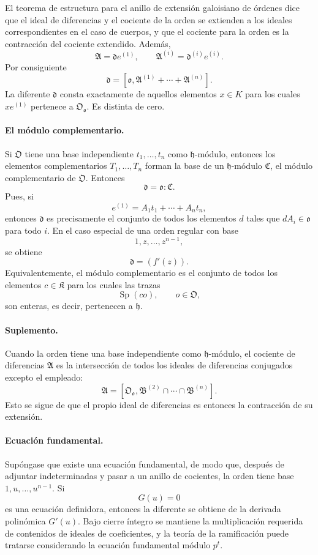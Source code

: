 \documentclass[11pt]{article}
\begin{document}
El teorema de estructura para el anillo de extensión galoisiano de órdenes dice que el ideal de diferencias y el cociente de la orden se extienden a los ideales correspondientes en el caso de cuerpos, y que el cociente para la orden es la contracción del cociente extendido. Además,
\[
        \mathfrak A=\mathfrak d e^{(1)},
        \qquad
        \mathfrak A^{(i)}=\mathfrak d^{(i)}e^{(i)}.
\]
Por consiguiente
\[
        \mathfrak d=[\mathfrak o,
        \mathfrak A^{(1)}+
        \cdots+\mathfrak A^{(n)}].
\]
La diferente $\mathfrak d$ consta exactamente de aquellos elementos $x\in K$ para los cuales $xe^{(1)}$ pertenece a $\mathfrak O_{\mathfrak o}$. Es distinta de cero.

\paragraph{El módulo complementario.}
Si $\mathfrak O$ tiene una base independiente $t_1,\ldots,t_n$ como $\mathfrak h$-módulo, entonces los elementos complementarios $T_1,\ldots,T_n$ forman la base de un $\mathfrak h$-módulo $\mathfrak C$, el módulo complementario de $\mathfrak O$. Entonces
\[
        \mathfrak d=\mathfrak o:\mathfrak C.
\]
Pues, si
\[
        e^{(1)}=A_1t_1+
        \cdots+A_nt_n,
\]
entonces $\mathfrak d$ es precisamente el conjunto de todos los elementos $d$ tales que $dA_i\in\mathfrak o$ para todo $i$. En el caso especial de una orden regular con base
\[
        1,z,\ldots,z^{n-1},
\]
se obtiene
\[
        \mathfrak d=(f'(z)).
\]
Equivalentemente, el módulo complementario es el conjunto de todos los elementos $c\in\mathfrak K$ para los cuales las trazas
\[
        \operatorname{Sp}(co),\qquad o\in\mathfrak O,
\]
son enteras, es decir, pertenecen a $\mathfrak h$.

\paragraph{Suplemento.}
Cuando la orden tiene una base independiente como $\mathfrak h$-módulo, el cociente de diferencias $\mathfrak A$ es la intersección de todos los ideales de diferencias conjugados excepto el empleado:
\[
        \mathfrak A=[\mathfrak O_{\mathfrak o},
        \mathfrak B^{(2)}\cap\cdots\cap\mathfrak B^{(n)}].
\]
Esto se sigue de que el propio ideal de diferencias es entonces la contracción de su extensión.

\paragraph{Ecuación fundamental.}
Supóngase que existe una ecuación fundamental, de modo que, después de adjuntar indeterminadas y pasar a un anillo de cocientes, la orden tiene base $1,u,\ldots,u^{n-1}$. Si
\[
        G(u)=0
\]
es una ecuación definidora, entonces la diferente se obtiene de la derivada polinómica $G'(u)$. Bajo cierre íntegro se mantiene la multiplicación requerida de contenidos de ideales de coeficientes, y la teoría de la ramificación puede tratarse considerando la ecuación fundamental módulo $p^t$.
\end{document}

